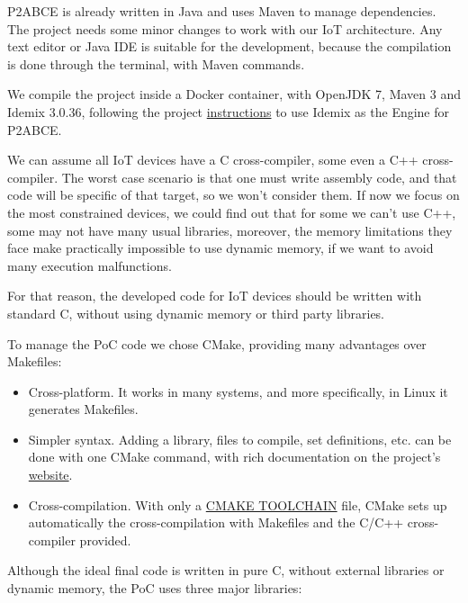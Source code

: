 \hfil

P2ABCE is already written in Java and uses Maven to manage dependencies. The project needs some minor changes to work with our IoT architecture. Any text editor or Java IDE is suitable for the development, because the compilation is done through the terminal, with Maven commands.

We compile the project inside a Docker container, with OpenJDK 7, Maven 3 and Idemix 3.0.36, following the project \href{https://github.com/p2abcengine/p2abcengine/wiki/How-to-Build-the-ABC-Engine}{instructions} to use Idemix as the Engine for P2ABCE.

\hfil

We can assume all IoT devices have a C cross-compiler, some even a C++ cross-compiler. The worst case scenario is that one must write assembly code, and that code will be specific of that target, so we won't consider them.
If now we focus on the most constrained devices, we could find out that for some we can't use C++, some may not have many usual libraries, moreover, the memory limitations they face make practically impossible to use dynamic memory, if we want to avoid many execution malfunctions.

For that reason, the developed code for IoT devices should be written with standard C, without using dynamic memory or third party libraries.

\hfil


To manage the PoC code we chose CMake, providing many advantages over Makefiles:

\begin{itemize}
	\item Cross-platform. It works in many systems, and more specifically, in Linux it generates Makefiles.
	\item Simpler syntax. Adding a library, files to compile, set definitions, etc. can be done with one CMake command, with rich documentation on the project's \href{https://cmake.org/cmake/help/latest/}{website}.
	\item Cross-compilation. With only a \href{http://www.vtk.org/Wiki/CMake_Cross_Compiling#The_toolchain_file}{\small{CMAKE TOOLCHAIN}} file, CMake sets up automatically the cross-compilation with Makefiles and the C/C++ cross-compiler provided.
\end{itemize}


\hfil

Although the ideal final code is written in pure C, without external libraries or dynamic memory, the PoC uses three major libraries:

